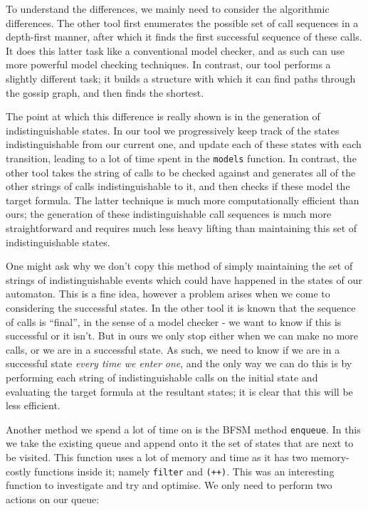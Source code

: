 \documentclass[12pt, a4paper]{article}
\begin{document}
\bigskip

To understand the differences, we mainly need to consider the algorithmic
differences. The other tool first enumerates the possible set of call sequences
in a depth-first manner, after which it finds the first successful sequence of
these calls. It does this latter task like a conventional model checker, and as
such can use more powerful model checking techniques. In contrast, our tool
performs a slightly different task; it builds a structure with which it can find
paths through the gossip graph, and then finds the shortest.

The point at which this difference is really shown is in the generation of
indistinguishable states. In our tool we progressively keep track of the states
indistinguishable from our current one, and update each of these states with
each transition, leading to a lot of time spent in the \texttt{models} function.
In contrast, the other tool takes the string of calls to be checked against and
generates all of the other strings of calls indistinguishable to it, and then
checks if these model the target formula. The latter technique is much more
computationally efficient than ours; the generation of these indistinguishable
call sequences is much more straightforward and requires much less heavy lifting
than maintaining this set of indistinguishable states.


One might ask why we don't copy this method of simply maintaining the set of
strings of indistinguishable events which could have happened in the states of
our automaton. This is a fine idea, however a problem arises when we come to
considering the successful states. In the other tool it is known that the
sequence of calls is ``final'', in the sense of a model checker - we want to
know if this is successful or it isn't. But in ours we only stop either when we
can make no more calls, or we are in a successful state. As such, we need to
know if we are in a successful state \textit{every time we enter one}, and the
only way we can do this is by performing each string of indistinguishable calls
on the initial state and evaluating the target formula at the resultant states;
it is clear that this will be less efficient.

\bigskip

Another method we spend a lot of time on is the BFSM method \texttt{enqueue}. In
this we take the existing queue and append onto it the set of states that are
next to be visited. This function uses a lot of memory and time as it has two
memory-costly functions inside it; namely \texttt{filter} and \texttt{(++)}.
This was an interesting function to investigate and try and optimise. We only
need to perform two actions on our queue:
\end{document}
